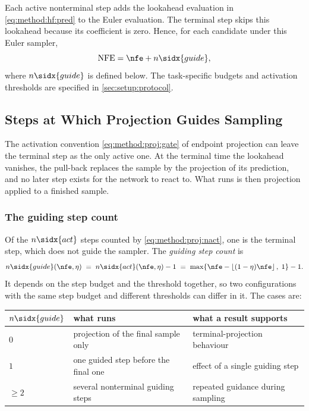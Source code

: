 Each active nonterminal step adds the lookahead evaluation in \eqref{eq:method:hf:pred} to the
Euler evaluation. The terminal step skips this lookahead because its coefficient is zero. Hence,
for each candidate under this Euler sampler,
\begin{equation}\label{eq:method:hf:nfe}
  \mathrm{NFE}=\nfe+n\sidx{guide},
\end{equation}
where $n\sidx{guide}$ is defined below. The task-specific budgets and activation thresholds are
specified in \autoref{sec:setup:protocol}.

\subsection{Steps at Which Projection Guides Sampling}\label{sec:method:degenerate}

The activation convention \eqref{eq:method:proj:gate} of endpoint projection can leave the terminal step
as the only active one. At the terminal time the lookahead vanishes, the pull-back replaces the sample
by the projection of its prediction, and no later step exists for the network to react to. What runs is
then projection applied to a finished sample.

\subsubsection*{The guiding step count}

Of the $n\sidx{act}$ steps counted by \eqref{eq:method:proj:nact}, one is the terminal step, which does
not guide the sampler. The \emph{guiding step count} is
\begin{equation}\label{eq:method:degen:ngen}
  n\sidx{guide}(\nfe,\eta)
  \;=\; n\sidx{act}(\nfe,\eta) - 1
  \;=\; \max\!\left\{\nfe - \left\lfloor(1-\eta)\nfe\right\rfloor,\;1\right\} - 1 .
\end{equation}
It depends on the step budget and the threshold together, so two configurations with the same step
budget and different thresholds can differ in it. The cases are:

\begin{center}
\begin{tabularx}{\linewidth}{lLL}
  \toprule
  $n\sidx{guide}$ & what runs & what a result supports \\
  \midrule
  $0$     & projection of the final sample only        & terminal-projection behaviour \\
  $1$     & one guided step before the final one       & effect of a single guiding step \\
  $\ge 2$ & several nonterminal guiding steps          & repeated guidance during sampling \\
  \bottomrule
\end{tabularx}
\end{center}

